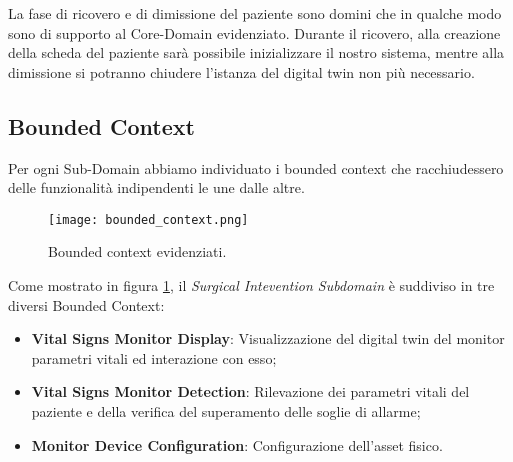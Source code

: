 La fase di ricovero e di dimissione del paziente sono domini che in qualche modo sono di supporto al Core-Domain evidenziato.
\newline Durante il ricovero, alla creazione della scheda del paziente sarà possibile inizializzare il nostro sistema, mentre alla dimissione si potranno chiudere l'istanza del digital twin non più necessario.

\subsection{Bounded Context}

Per ogni Sub-Domain abbiamo individuato i bounded context che racchiudessero delle funzionalità indipendenti le une dalle altre.

\begin{figure}[H]
    \texttt{[image: bounded\_context.png]}
    \centering
    \caption{\label{pic:bounded-context}Bounded context evidenziati.}
\end{figure}

Come mostrato in figura     \ref{pic:bounded-context}, il \textit{Surgical Intevention Subdomain} è suddiviso in tre diversi Bounded Context:

\begin{itemize}
    \item \textbf{Vital Signs Monitor Display}: Visualizzazione del digital twin del monitor parametri vitali ed interazione con esso;
    \item \textbf{Vital Signs Monitor Detection}: Rilevazione dei parametri vitali del paziente e della verifica del superamento delle soglie di allarme;
    \item \textbf{Monitor Device Configuration}: Configurazione dell'asset fisico. 
\end{itemize}